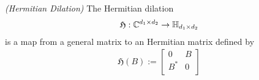 \begin{definition}
  \emph{(Hermitian Dilation)}
  The Hermitian dilation
  \begin{gather*}
    \mathfrak{H} : \mathbb{C}^{d_1 \times d_2} \to \mathbb{H}_{d_1 \times d_2}
  \end{gather*}
  is a map from a general matrix to an Hermitian matrix defined by
  \begin{gather}
    \label{ rmineq_hermitian_dilation } 
    \mathfrak{H}(B)
    :=
    \begin{bmatrix}
      0   & B \\
      B^* & 0 \\
    \end{bmatrix}
  \end{gather}
\end{definition}




